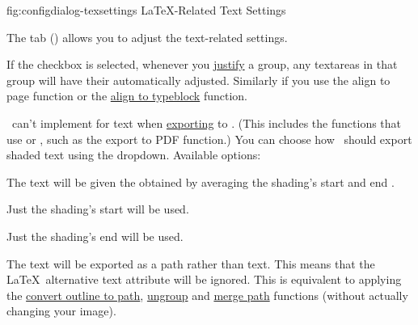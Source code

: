 
\FloatFig
  {fig:configdialog-texsettings}
  {}
  {LaTeX-Related Text Settings}

The  tab
()
allows you to adjust the text-related settings.


If the  \gls{checkbox} is selected,
whenever you \hyperref[sec:alignobjects]{justify} a \gls{group}, any
\glspl{textarea} in that group will have their
 automatically adjusted. Similarly if you use the 
align to page function or the \hyperref[sec:aligntotypeblock]{align
to typeblock} function.


\FlowframTk\ can't implement  for text when
\hyperref[sec:exportpgf]{exporting} to . (This includes the
 functions that use  or , such as
the export to PDF function.) You can choose how \FlowframTk\ should export
shaded text using the 
\gls*{dropdown}. Available options:

\begin{deflist}
\itemtitle
 {}

\begin{itemdesc}
The text will be given the  obtained by averaging the
shading's start and end .
\end{itemdesc}

\itemtitle
 {}

\begin{itemdesc}
Just the shading's start  will be used.
\end{itemdesc}

\itemtitle
 {}

\begin{itemdesc}
Just the shading's end  will be used.
\end{itemdesc}

\itemtitle
 {}

\begin{itemdesc}
The text will be exported as a path rather than text. This means
that the \LaTeX\ alternative text attribute will be ignored. This is
equivalent to applying the 
\hyperref[sec:outlinetopath]{convert outline to path}, 
\hyperref[sec:grouping]{ungroup} and 
\hyperref[sec:mergepaths]{merge path}
functions (without actually changing your image).
\end{itemdesc}

\end{deflist}

